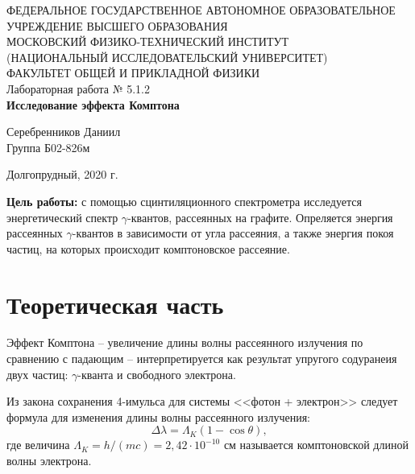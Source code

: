 \documentclass[a4paper,12pt]{article} %
\begin{document}
\begin{center}
	\footnotesize{ФЕДЕРАЛЬНОЕ ГОСУДАРСТВЕННОЕ АВТОНОМНОЕ ОБРАЗОВАТЕЛЬНОЕ 			УЧРЕЖДЕНИЕ ВЫСШЕГО ОБРАЗОВАНИЯ}\\
	\footnotesize{МОСКОВСКИЙ ФИЗИКО-ТЕХНИЧЕСКИЙ ИНСТИТУТ\\(НАЦИОНАЛЬНЫЙ 			ИССЛЕДОВАТЕЛЬСКИЙ УНИВЕРСИТЕТ)}\\
	\footnotesize{ФАКУЛЬТЕТ ОБЩЕЙ И ПРИКЛАДНОЙ ФИЗИКИ\\}
	\hfill \break
	\hfill\break
	\hfill\break
	\hfill \break
	\hfill \break
	\hfill \break
	\hfill \break
	\hfill \break
	\hfill \break
	\hfill \break
	\hfill \break
	\hfill \break
	\hfill \break
	\hfill \break
	\large{Лабораторная работа № 5.1.2 \\\textbf{Исследование эффекта Комптона}}\\
	\hfill \break
	\hfill \break
	\hfill \break
	\begin{flushright}
		Серебренников Даниил\\
		Группа Б02-826м
	\end{flushright}
	\hfill \break
	\hfill \break
	\hfill \break
	\hfill \break
	\hfill \break
	\hfill \break
	\hfill \break
	\hfill \break
	\hfill \break
	\hfill \break
	\hfill \break
\end{center}
\begin{center}
	Долгопрудный, 2020 г.
\end{center}
\thispagestyle{empty}
\newpage
	\textbf{Цель работы:} с помощью сцинтиляционного спектрометра исследуется энергетический спектр $\gamma$-квантов, рассеянных на графите. Опреляется энергия рассеянных $\gamma$-квантов в зависимости от угла рассеяния, а также энергия покоя частиц, на которых происходит комптоновское рассеяние.

\section{Теоретическая часть}
	Эффект Комптона -- увеличение длины волны рассеянного излучения по сравнению с падающим -- интерпретируется как результат упругого содуранеия двух частиц: $\gamma$-кванта и свободного электрона.
	
	Из закона сохранения 4-имульса для системы <<фотон + электрон>> следует формула для изменения длины волны рассеянного излучения:
	\begin{equation}
		\label{Kompton}
		\tag{$\star$}
		\Delta \lambda = \Lambda_K(1-\cos\theta),
	\end{equation}
	где величина $\Lambda_K = h/(mc) = 2,42 \cdot 10^{-10}$ см называется комптоновской длиной волны электрона.
	
\end{document}
